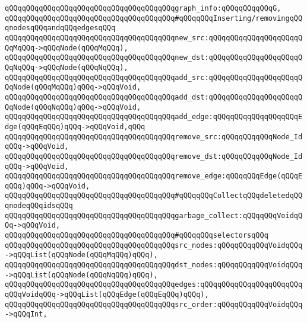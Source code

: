 \verb|qQQqqQQqqQQqqQQqqQQqqQQqqQQqqQQqqQQqqQQqgraph_info:qQQqqQQqqQQqG,|\newline
\newline
\verb|qQQqqQQqqQQqqQQqqQQqqQQqqQQqqQQqqQQqqQQq#qQQqqQQqInserting/removingqQQqnodesqQQqandqQQqedgesqQQq|\newline
\verb|qQQqqQQqqQQqqQQqqQQqqQQqqQQqqQQqqQQqqQQqnew_src:qQQqqQQqqQQqqQQqqQQqqQQqMqQQq->qQQqNode(qQQqMqQQq),|\newline
\verb|qQQqqQQqqQQqqQQqqQQqqQQqqQQqqQQqqQQqqQQqnew_dst:qQQqqQQqqQQqqQQqqQQqqQQqNqQQq->qQQqNode(qQQqNqQQq),|\newline
\verb|qQQqqQQqqQQqqQQqqQQqqQQqqQQqqQQqqQQqqQQqadd_src:qQQqqQQqqQQqqQQqqQQqqQQqNode(qQQqMqQQq)qQQq->qQQqVoid,|\newline
\verb|qQQqqQQqqQQqqQQqqQQqqQQqqQQqqQQqqQQqqQQqadd_dst:qQQqqQQqqQQqqQQqqQQqqQQqNode(qQQqNqQQq)qQQq->qQQqVoid,|\newline
\verb|qQQqqQQqqQQqqQQqqQQqqQQqqQQqqQQqqQQqqQQqadd_edge:qQQqqQQqqQQqqQQqqQQqEdge(qQQqEqQQq)qQQq->qQQqVoid,qQQq|\newline
\verb|qQQqqQQqqQQqqQQqqQQqqQQqqQQqqQQqqQQqqQQqremove_src:qQQqqQQqqQQqNode_IdqQQq->qQQqVoid,|\newline
\verb|qQQqqQQqqQQqqQQqqQQqqQQqqQQqqQQqqQQqqQQqremove_dst:qQQqqQQqqQQqNode_IdqQQq->qQQqVoid,|\newline
\verb|qQQqqQQqqQQqqQQqqQQqqQQqqQQqqQQqqQQqqQQqremove_edge:qQQqqQQqEdge(qQQqEqQQq)qQQq->qQQqVoid,|\newline
\newline
\verb|qQQqqQQqqQQqqQQqqQQqqQQqqQQqqQQqqQQqqQQq#qQQqqQQqCollectqQQqdeletedqQQqnodeqQQqidsqQQq|\newline
\verb|qQQqqQQqqQQqqQQqqQQqqQQqqQQqqQQqqQQqqQQqgarbage_collect:qQQqqQQqVoidqQQq->qQQqVoid,|\newline
\newline
\verb|qQQqqQQqqQQqqQQqqQQqqQQqqQQqqQQqqQQqqQQq#qQQqqQQqselectorsqQQq|\newline
\verb|qQQqqQQqqQQqqQQqqQQqqQQqqQQqqQQqqQQqqQQqsrc_nodes:qQQqqQQqqQQqVoidqQQq->qQQqList(qQQqNode(qQQqMqQQq)qQQq),|\newline
\verb|qQQqqQQqqQQqqQQqqQQqqQQqqQQqqQQqqQQqqQQqdst_nodes:qQQqqQQqqQQqVoidqQQq->qQQqList(qQQqNode(qQQqNqQQq)qQQq),|\newline
\verb|qQQqqQQqqQQqqQQqqQQqqQQqqQQqqQQqqQQqqQQqedges:qQQqqQQqqQQqqQQqqQQqqQQqqQQqVoidqQQq->qQQqList(qQQqEdge(qQQqEqQQq)qQQq),|\newline
\verb|qQQqqQQqqQQqqQQqqQQqqQQqqQQqqQQqqQQqqQQqsrc_order:qQQqqQQqqQQqVoidqQQq->qQQqInt,|\newline
